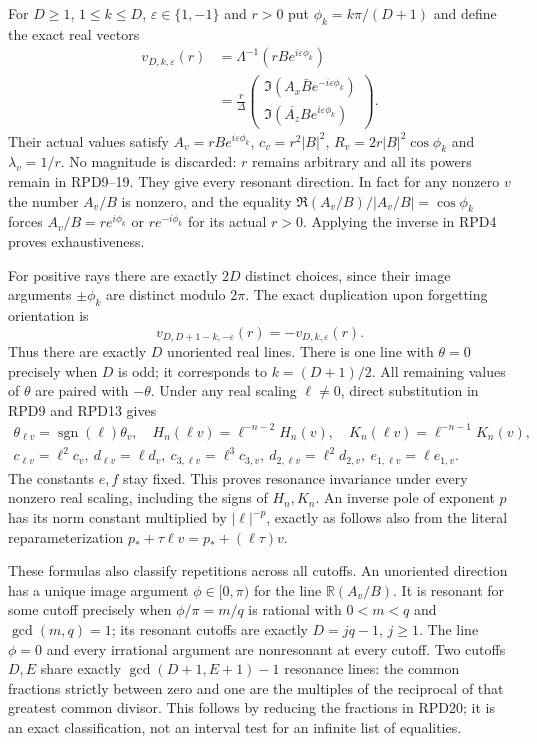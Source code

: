 For $D\ge1$, $1\le k\le D$, $\varepsilon\in\{1,-1\}$ and $r>0$
put $\phi_k=k\pi/(D+1)$ and define the exact real vectors
\[
 \begin{aligned}
 v_{D,k,\varepsilon}(r)
 &=\Lambda^{-1}(rB e^{i\varepsilon\phi_k})\\
 &=\frac r\Delta
 \begin{pmatrix}
 \Im(A_x\bar B e^{-i\varepsilon\phi_k})\\
 \Im(\overline{A_z}B e^{i\varepsilon\phi_k})
 \end{pmatrix}.
 \end{aligned}\tag{RPD20}
\]
Their actual values satisfy $A_v=rB e^{i\varepsilon\phi_k}$,
$c_v=r^2|B|^2$, $R_v=2r|B|^2\cos\phi_k$ and
$\lambda_v=1/r$.  No magnitude is discarded: $r$ remains arbitrary
and all its powers remain in RPD9--19.
They give every resonant direction.  In fact for any nonzero $v$
the number $A_v/B$ is nonzero, and the equality
$\Re(A_v/B)/|A_v/B|=\cos\phi_k$ forces
$A_v/B=r e^{i\phi_k}$ or $r e^{-i\phi_k}$ for its actual $r>0$.
Applying the inverse in RPD4 proves exhaustiveness.

For positive rays there are exactly $2D$ distinct choices, since
their image arguments $\pm\phi_k$ are distinct modulo $2\pi$.
The exact duplication upon forgetting orientation is
\[
 v_{D,D+1-k,-\varepsilon}(r)=-v_{D,k,\varepsilon}(r).
 \tag{RPD21}
\]
Thus there are exactly $D$ unoriented real lines.  There is one
line with $\theta=0$ precisely when $D$ is odd; it corresponds to
$k=(D+1)/2$.  All remaining values of $\theta$ are paired with
$-\theta$.  Under any real scaling $\ell\ne0$, direct substitution
in RPD9 and RPD13 gives
\[
 \begin{gathered}
 \theta_{\ell v}=\operatorname{sgn}(\ell)\theta_v,\quad
 H_n(\ell v)=\ell^{-n-2}H_n(v),\quad
 K_n(\ell v)=\ell^{-n-1}K_n(v),\\
 c_{\ell v}=\ell^2c_v,\ d_{\ell v}=\ell d_v,\
 c_{3,\ell v}=\ell^3c_{3,v},\ d_{2,\ell v}=\ell^2d_{2,v},\
 e_{1,\ell v}=\ell e_{1,v}.
 \end{gathered}
 \tag{RPD22}
\]
The constants $e,f$ stay fixed.  This proves resonance invariance
under every nonzero real scaling, including the signs of $H_n,K_n$.
An inverse pole of exponent $p$ has its norm constant multiplied by
$|\ell|^{-p}$, exactly as follows also from the literal reparameterization
$p_*+\tau\ell v=p_*+(\ell\tau)v$.

These formulas also classify repetitions across all cutoffs.  An
unoriented direction has a unique image argument
$\phi\in[0,\pi)$ for the line $\mathbb R(A_v/B)$.
It is resonant for some cutoff precisely when
$\phi/\pi=m/q$ is rational with $0<m<q$ and $\gcd(m,q)=1$;
its resonant cutoffs are exactly $D=jq-1$, $j\ge1$.
The line $\phi=0$ and every irrational argument are nonresonant at
every cutoff.  Two cutoffs $D,E$ share exactly
$\gcd(D+1,E+1)-1$ resonance lines: the common fractions strictly
between zero and one are the multiples of the reciprocal of that
greatest common divisor.  This follows by reducing the fractions
in RPD20; it is an exact classification, not an interval test for
an infinite list of equalities.

